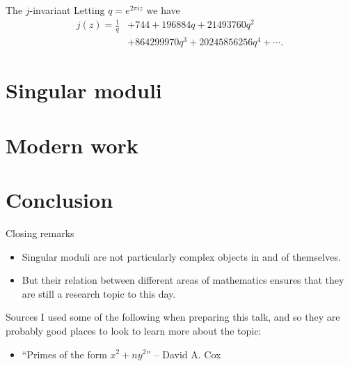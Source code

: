 \documentclass{beamer}
\begin{document}
\begin{frame}{The $j$-invariant}
\note{
}
Letting $q = e^{2\pi i z}$ we have
\begin{align*}
j(z) = \frac{1}{q} &+ 744 + 196884q + 21493760q^2 \\
&+ 864299970q^3 + 20245856256q^4 + \cdots.\
\end{align*}
\end{frame}

\section{Singular moduli}

\section{Modern work}

\section{Conclusion}
\begin{frame}{Closing remarks}
\begin{itemize}
\item Singular moduli are not particularly complex objects in and of themselves.
\pause \item But their relation between different areas of mathematics ensures that they are still a research topic to this day.
\end{itemize}
\end{frame}

\begin{frame}{Sources}
I used some of the following when preparing this talk, and so they are probably good places to look to learn more about the topic:
\begin{itemize}
\item ``Primes of the form $x^2 + ny^2$'' -- David A. Cox
\end{itemize}
\end{frame}
\end{document}
